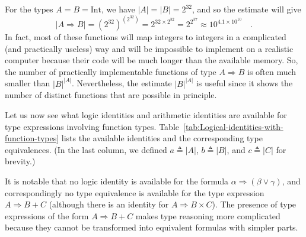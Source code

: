 For the types $A=B=\text{Int}$, we have $\left|A\right|=\left|B\right|=2^{32}$,
and so the estimate will give 
\[
\left|A\Rightarrow B\right|=\left(2^{32}\right)^{\left(2^{32}\right)}=2^{32\times2^{32}}=2^{2^{37}}\approx10^{4.1\times10^{10}}\quad.
\]
In fact, most of these functions will map integers to integers in
a complicated (and practically useless) way and will be impossible
to implement on a realistic computer because their code will be much
longer than the available memory. So, the number of practically implementable
functions of type $A\Rightarrow B$ is often much smaller than $\left|B\right|^{\left|A\right|}$.
Nevertheless, the estimate $\left|B\right|^{\left|A\right|}$ is useful
since it shows the number of distinct functions that are possible
in principle.

Let us now see what logic identities and arithmetic identities are
available for type expressions involving function types. Table~\ref{tab:Logical-identities-with-function-types}
lists the available identities and the corresponding type equivalences.
(In the last column, we defined $a\triangleq\left|A\right|$, $b\triangleq\left|B\right|$,
and $c\triangleq\left|C\right|$ for brevity.) 

It is notable that no logic identity is available for the formula
$\alpha\Rightarrow\left(\beta\vee\gamma\right)$, and correspondingly
no type equivalence is available for the type expression $A\Rightarrow B+C$
(although there is an identity for $A\Rightarrow B\times C$). The
presence of type expressions of the form $A\Rightarrow B+C$ makes
type reasoning more complicated because they cannot be transformed
into equivalent formulas with simpler parts.

